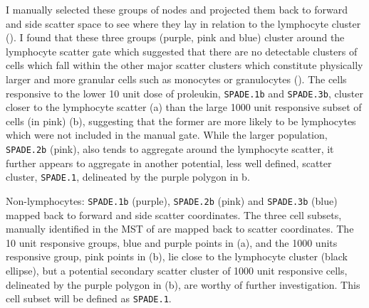 I manually selected these groups of nodes and projected them back to forward and side scatter space to see where they lay in relation
to the lymphocyte cluster ().  
I found that these three groups (purple, pink and blue) cluster around the lymphocyte scatter gate which suggested that there are no detectable clusters of cells which fall within the other major scatter clusters which constitute physically larger and more granular cells such as monocytes or granulocytes ().
The cells responsive to the lower 10 unit dose of proleukin, \texttt{SPADE.1b} and \texttt{SPADE.3b}, cluster closer to the lymphocyte scatter (a) than the large 1000 unit responsive subset of cells (in pink) (b), suggesting that the former are more likely to be lymphocytes which were not included in the manual gate.
While the larger population, \texttt{SPADE.2b} (pink), also tends to aggregate around the lymphocyte scatter, it further appears to aggregate in another potential, less well defined, scatter cluster, \texttt{SPADE.1}, delineated by the purple polygon in b.

{
 Non-lymphocytes: \texttt{SPADE.1b} (purple), \texttt{SPADE.2b} (pink) and \texttt{SPADE.3b} (blue) mapped back to forward and side scatter coordinates.
}
{
 The three cell subsets, manually identified in the \gls{MST} of  are mapped back to scatter coordinates.
 The 10 unit responsive groups, blue and purple points in (a), and the 1000 units responsive group, pink points in (b), lie close to the lymphocyte cluster (black ellipse), but a potential secondary scatter cluster of 1000 unit responsive cells, delineated by the purple polygon in (b), are worthy of further investigation.
 This cell subset will be defined as \texttt{SPADE.1}.
}

